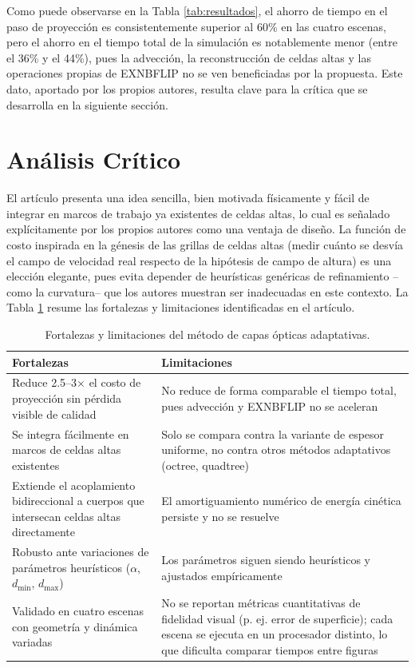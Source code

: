 \documentclass[sigconf,nonacm]{acmart}
\begin{document}
Como puede observarse en la Tabla \ref{tab:resultados}, el ahorro de tiempo en el paso de proyección es consistentemente superior al 60\% en las cuatro escenas, pero el ahorro en el tiempo total de la simulación es notablemente menor (entre el 36\% y el 44\%), pues la advección, la reconstrucción de celdas altas y las operaciones propias de EXNBFLIP no se ven beneficiadas por la propuesta. Este dato, aportado por los propios autores, resulta clave para la crítica que se desarrolla en la siguiente sección.

\section{Análisis Crítico}
El artículo presenta una idea sencilla, bien motivada físicamente y fácil de integrar en marcos de trabajo ya existentes de celdas altas, lo cual es señalado explícitamente por los propios autores como una ventaja de diseño. La función de costo inspirada en la génesis de las grillas de celdas altas (medir cuánto se desvía el campo de velocidad real respecto de la hipótesis de campo de altura) es una elección elegante, pues evita depender de heurísticas genéricas de refinamiento --como la curvatura-- que los autores muestran ser inadecuadas en este contexto. La Tabla \ref{tab:critica} resume las fortalezas y limitaciones identificadas en el artículo.

\begin{table}[t]
\caption{Fortalezas y limitaciones del método de capas ópticas adaptativas.}
\label{tab:critica}
\begin{tabular}{p{3.7cm}p{3.7cm}}
\toprule
\textbf{Fortalezas} & \textbf{Limitaciones} \\
\midrule
Reduce 2.5--3$\times$ el costo de proyección sin pérdida visible de calidad &
No reduce de forma comparable el tiempo total, pues advección y EXNBFLIP no se aceleran \\
\addlinespace
Se integra fácilmente en marcos de celdas altas existentes &
Solo se compara contra la variante de espesor uniforme, no contra otros métodos adaptativos (octree, quadtree) \\
\addlinespace
Extiende el acoplamiento bidireccional a cuerpos que intersecan celdas altas directamente &
El amortiguamiento numérico de energía cinética persiste y no se resuelve \\
\addlinespace
Robusto ante variaciones de parámetros heurísticos ($\alpha$, $d_{\min}$, $d_{\max}$) &
Los parámetros siguen siendo heurísticos y ajustados empíricamente \\
\addlinespace
Validado en cuatro escenas con geometría y dinámica variadas &
No se reportan métricas cuantitativas de fidelidad visual (p. ej. error de superficie); cada escena se ejecuta en un procesador distinto, lo que dificulta comparar tiempos entre figuras \\
\bottomrule
\end{tabular}
\end{table}
\end{document}
